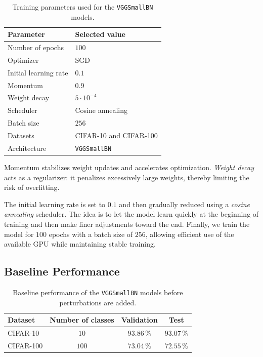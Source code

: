 \begin{table}[H]
    \centering
    \small
    \begin{tabular}{|l|l|}
        \hline
        \textbf{Parameter} & \textbf{Selected value} \\
        \hline
        Number of epochs & $100$ \\
        \hline
        Optimizer & SGD \\
        \hline
        Initial learning rate & $0.1$ \\
        \hline
        Momentum & $0.9$ \\
        \hline
        Weight decay & $5\cdot 10^{-4}$ \\
        \hline
        Scheduler & Cosine annealing \\
        \hline
        Batch size & $256$ \\
        \hline
        Datasets & CIFAR-10 and CIFAR-100 \\
        \hline
        Architecture & \texttt{VGGSmallBN} \\
        \hline
    \end{tabular}
    \caption{Training parameters used for the \texttt{VGGSmallBN} models.}
    \label{tab:parametres_entrainement_vgg}
\end{table}

Momentum stabilizes weight updates and
accelerates optimization. \textit{Weight decay} acts as a regularizer: it penalizes
excessively large weights, thereby limiting the risk of overfitting.

The initial learning rate is set to $0.1$ and then gradually reduced using a
\textit{cosine annealing} scheduler. The idea is to let the model learn quickly at the beginning of
training and then make finer adjustments toward the end. Finally,
we train the model for $100$ epochs with a batch size of $256$, allowing
efficient use of the available GPU while maintaining stable training.

\subsection{Baseline Performance}

\begin{table}[H]
    \centering
    \small
    \begin{tabular}{|l|c|c|c|}
        \hline
        \textbf{Dataset} & \textbf{Number of classes} & \textbf{Validation} & \textbf{Test} \\
        \hline
        CIFAR-10 & $10$ & $93.86\,\%$ & $93.07\,\%$ \\
        \hline
        CIFAR-100 & $100$ & $73.04\,\%$ & $72.55\,\%$ \\
        \hline
    \end{tabular}
    \caption{Baseline performance of the \texttt{VGGSmallBN} models before perturbations are added.}
    \label{tab:performance_reference_vgg}
\end{table}

